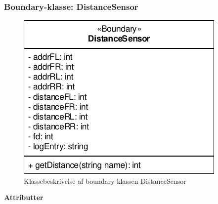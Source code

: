 \subsubsection{Boundary-klasse: DistanceSensor}

\begin{figure}[h]
\centering
\includegraphics[]{../fig/diagrammer/bil/cd_distancesensor.pdf}
\caption{Klassebeskrivelse af boundary-klassen DistanceSensor}
\label{fig:cd_distancesensor}
\end{figure}

\textbf{Attributter}

